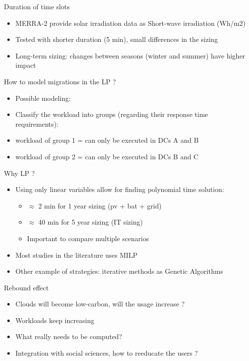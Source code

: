 \documentclass[Ligatures=TeX,table,svgnames,usetotalslideindicator,compress,10pt,aspectratio=169]{beamer}
\begin{document}
\begin{frame}{Duration of time slots}
    \begin{itemize}
        \item MERRA-2 provide solar irradiation data as Short-wave irradiation (Wh/m2)            
        \item Tested with shorter duration (5 min), small differences in the sizing 
        \item Long-term sizing: changes between seasons (winter and summer) have higher impact
    \end{itemize}
\end{frame}


\begin{frame}{How to model migrations in the LP ?}
\begin{itemize}        
    \item Possible modeling:    
    \item Classify the workload into groups (regarding their response time requirements): 
    \item workload of group 1 = can only be executed in DCs A and B 
    \item workload of group 2 = can only be executed in DCs B and C
    
\end{itemize}
\end{frame}



\begin{frame}{Why LP ?}
\begin{itemize}    
    \item Using only linear variables allow for finding polynomial time solution:
    \begin{itemize}
        \item $\approx$ 2 min for 1 year sizing (pv + bat + grid)
        \item $\approx$ 40 min for 5 year sizing (IT sizing)
        \item Important to compare multiple scenarios
    \end{itemize}    
    \item Most studies in the literature uses MILP
    \item Other example of strategies: iterative methods as Genetic Algorithms
\end{itemize}
\end{frame}

\begin{frame}{Rebound effect}
\begin{itemize}    
    \item Clouds will become low-carbon, will the usage increase ? 
    \item Workloads keep increasing
    \item What really needs to be computed?
    \item Integration with social sciences, how to reeducate the users ?   
\end{itemize}
\end{frame}
\end{document}

